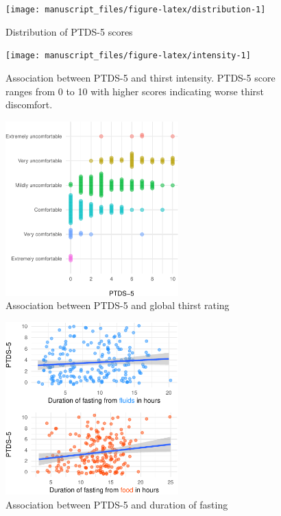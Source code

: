 \documentclass[letterpaper,9pt,twocolumn,twoside,]{pinp}
\begin{document}
\begin{figure}

{\centering \texttt{[image: manuscript\_files/figure-latex/distribution-1]} 

}

\caption{Distribution of PTDS-5 scores}\label{fig:distribution}
\end{figure}

\begin{figure}

{\centering \texttt{[image: manuscript\_files/figure-latex/intensity-1]} 

}

\caption{Association between PTDS-5 and thirst intensity. PTDS-5 score ranges from 0 to 10 with higher scores indicating worse thirst discomfort.}\label{fig:intensity}
\end{figure}

\begin{figure}

{\centering \includegraphics[width=252px]{manuscript_files/figure-latex/globalthirst-1} 

}

\caption{Association between PTDS-5 and global thirst rating}\label{fig:globalthirst}
\end{figure}

\begin{figure}

{\centering \includegraphics[width=252px]{manuscript_files/figure-latex/fasting-1} 

}

\caption{Association between PTDS-5 and duration of fasting}\label{fig:fasting}
\end{figure}

\showacknow




\end{document}
